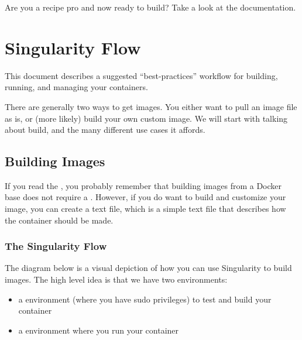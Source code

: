 \documentclass[letterpaper,10pt,english]{sphinxmanual}
\begin{document}
Are you a recipe pro and now ready to build? Take a look at the
{\hyperref[\detokenize{build_a_container:build-a-container}]{}} documentation.


\chapter{Singularity Flow}
\label{\detokenize{singularity_flow:singularity-flow}}\label{\detokenize{singularity_flow:id1}}\label{\detokenize{singularity_flow::doc}}
This document describes a suggested “best-practices” workflow for
building, running, and managing your containers.

There are generally two ways to get images. You either want to pull an
image file as is, or (more likely) build your own custom image. We
will start with talking about build, and the many different use cases
it affords.


\section{Building Images}
\label{\detokenize{singularity_flow:building-images}}\label{\detokenize{singularity_flow:sec-singularityflow}}
If you read the {\hyperref[\detokenize{quick_start:quick-start}]{}}, you probably remember that building images from a
Docker base does not require a {\hyperref[\detokenize{container_recipes:container-recipes}]{}}. However, if you do want to build and
customize your image, you can create a {\hyperref[\detokenize{container_recipes:container-recipes}]{}} text file, which is a simple
text file that describes how the container should be made.


\subsection{The Singularity Flow}
\label{\detokenize{singularity_flow:the-singularity-flow}}
The diagram below is a visual depiction of how you can use Singularity
to build images. The high level idea is that we have two environments:
\begin{itemize}
\item {} 
a  environment (where you have sudo privileges) to test and
build your container

\item {} 
a  environment where you run your container

\end{itemize}
\end{document}
